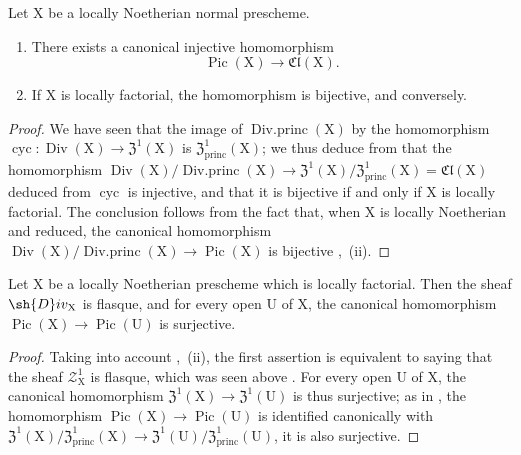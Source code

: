 \begin{corollary}[21.6.10]
\label{IV.21.6.10}
Let $\mathrm{X}$ be a locally Noetherian normal prescheme.
\begin{enumerate}[label=(\roman*)]
  \item There exists a canonical injective homomorphism
\[
\label{IV.21.6.10.1}
  \operatorname{Pic}(\mathrm{X})\to\mathfrak{Cl}(\mathrm{X}).
  \tag{21.6.10.1}
\]

  \item If $\mathrm{X}$ is locally factorial, the homomorphism  is bijective, and conversely.
\end{enumerate}
\end{corollary}

\begin{proof}
We have seen  that the image of $\operatorname{Div.princ}(\mathrm{X})$ by the homomorphism $\operatorname{cyc}:\operatorname{Div}(\mathrm{X})\to\mathfrak{Z}^1(\mathrm{X})$ is $\mathfrak{Z}^1_\mathrm{princ}(\mathrm{X})$;
we thus deduce from  that the homomorphism $\operatorname{Div}(\mathrm{X})/\operatorname{Div.princ}(\mathrm{X})\to\mathfrak{Z}^1(\mathrm{X})/\mathfrak{Z}^1_\mathrm{princ}(\mathrm{X})=\mathfrak{Cl}(\mathrm{X})$ deduced from $\operatorname{cyc}$ is injective, and that it is bijective if and only if $\mathrm{X}$ is locally factorial.
The conclusion follows from the fact that, when $\mathrm{X}$ is locally Noetherian and reduced, the canonical homomorphism $\operatorname{Div}(\mathrm{X})/\operatorname{Div.princ}(\mathrm{X})\to\operatorname{Pic}(\mathrm{X})$  is bijective ,{}~(ii).
\end{proof}

\begin{corollary}[21.6.11]
\label{IV.21.6.11}
Let $\mathrm{X}$ be a locally Noetherian prescheme which is locally factorial.
Then the sheaf $\sh{D}iv_\mathrm{X}$ is flasque, and for every open $\mathrm{U}$ of $\mathrm{X}$, the canonical homomorphism $\operatorname{Pic}(\mathrm{X})\to\operatorname{Pic}(\mathrm{U})$ is surjective.
\end{corollary}

\begin{proof}
Taking into account ,{}~(ii), the first assertion is equivalent to saying that the sheaf $\mathscr{Z}_\mathrm{X}^1$ is flasque, which was seen above .
For every open $\mathrm{U}$ of $\mathrm{X}$, the canonical homomorphism $\mathfrak{Z}^1(\mathrm{X})\to\mathfrak{Z}^1(\mathrm{U})$ is thus surjective;
as in , the homomorphism $\operatorname{Pic}(\mathrm{X})\to\operatorname{Pic}(\mathrm{U})$ is identified canonically with $\mathfrak{Z}^1(\mathrm{X})/\mathfrak{Z}^1_\mathrm{princ}(\mathrm{X})\to\mathfrak{Z}^1(\mathrm{U})/\mathfrak{Z}^1_\mathrm{princ}(\mathrm{U})$, it is also surjective.
\end{proof}

